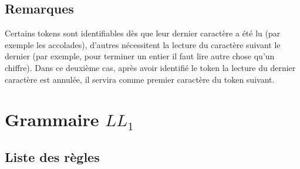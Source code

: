 \documentclass[a4paper,10pt]{article}
\begin{document}
	\subsection{Remarques}
		Certains tokens sont identifiables dès que leur dernier caractère a été lu (par exemple les accolades), 
		d'autres nécessitent la lecture du caractère suivant le dernier (par exemple, pour terminer un entier il faut lire autre chose qu'un chiffre).
		Dans ce deuxième cas, après avoir identifié le token la lecture du dernier caractère est annulée, il servira comme premier caractère du token suivant.

\section{Grammaire $LL_1$}

\setcounter{cnt}{1}

\newcommand{\varname}[1]{\begin{math}\langle\end{math}#1\begin{math}\rangle\end{math}}
\newcommand{\num}{\begin{math}[\thecnt]\end{math}\addtocounter{cnt}{1}}

\subsection{Liste des règles}
\end{document}
